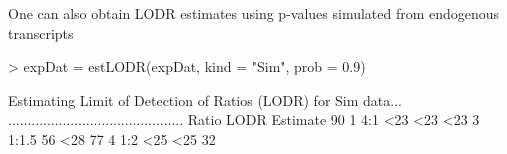 \documentclass{article}
\begin{document}
One can also obtain LODR estimates using p-values simulated from endogenous transcripts
\begin{center}
\begin{Schunk}
\begin{Sinput}
> expDat = estLODR(expDat, kind = "Sim", prob = 0.9)  
\end{Sinput}
\begin{Soutput}
Estimating Limit of Detection of Ratios (LODR) for  Sim  data...
.............................................
  Ratio LODR Estimate 90%
1   4:1           <23                <23                <23
3 1:1.5            56                <28                 77
4   1:2           <25                <25                 32
\end{Soutput}
\end{Schunk}
\end{center}
\end{document}
